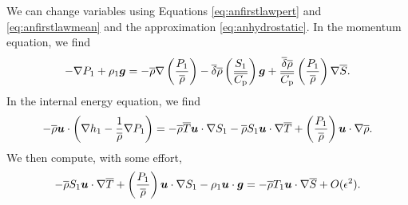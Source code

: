 \documentclass[12pt]{article}
\begin{document}
We can change variables using Equations \eqref{eq:anfirstlawpert} and \eqref{eq:anfirstlawmean} and the approximation \eqref{eq:anhydrostatic}. In the momentum equation, we find
\begin{align}\label{eq:anrhsmom}
	-\nabla P_1 + \rho_1\bm{g} = -\overline{\rho}\nabla\left(\frac{P_1}{\overline{\rho}}\right) - \overline{\delta} \overline{\rho} \left(\frac{S_1}{\overline{C_{\rm{p}}}}\right) \bm{g} + \frac{\overline{\delta}\overline{\rho}}{\overline{C_{\rm{p}}}} \left(\frac{P_1}{\overline{\rho}}\right)\nabla\overline{S}.
\end{align}
In the internal energy equation, we find
\begin{align}\label{eq:anrhsen}
	-\overline{\rho}\bm{u}\cdot\left(\nabla h_1-\frac{1}{\overline{\rho}}\nabla P_1\right) = -\overline{\rho}\overline{T}\bm{u}\cdot\nabla S_1 - \overline{\rho} S_1\bm{u}\cdot\nabla\overline{T} + \left(\frac{P_1}{\overline{\rho}}\right)\bm{u}\cdot\nabla \overline{\rho}.
\end{align}
We then compute, with some effort,
\begin{align}\label{eq:anrhsen2}
	- \overline{\rho} S_1\bm{u}\cdot\nabla\overline{T} + \left(\frac{P_1}{\overline{\rho}}\right)\bm{u}\cdot\nabla S_1 -\rho_1\bm{u}\cdot\bm{g} = -\overline{\rho} T_1\bm{u}\cdot\nabla\overline{S} + O(\epsilon^2).
\end{align}
\end{document}
